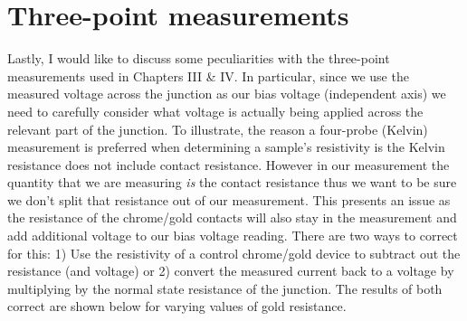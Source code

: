 \section{Three-point measurements}
Lastly, I would like to discuss some peculiarities with the three-point measurements used in Chapters III \& IV. In particular, since we use the measured voltage across the junction as our bias voltage (independent axis) we need to carefully consider what voltage is actually being applied across the relevant part of the junction. To illustrate, the reason a four-probe (Kelvin) measurement is preferred when determining a sample's resistivity is the Kelvin resistance does not include contact resistance\cite{Kuphaldt2015}. However in our measurement the quantity that we are measuring \textit{is} the contact resistance thus we want to be sure we don't split that resistance out of our measurement. This presents an issue as the resistance of the chrome/gold contacts will also stay in the measurement and add additional voltage to our bias voltage reading. There are two ways to correct for this: 1) Use the resistivity of a control chrome/gold device to subtract out the resistance (and voltage) or 2) convert the measured current back to a voltage by multiplying by the normal state resistance of the junction. The results of both correct are shown below for varying values of gold resistance.